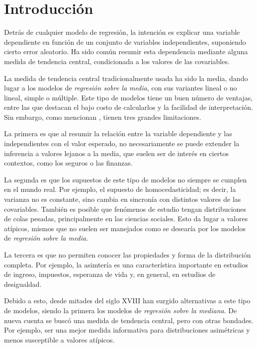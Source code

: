 \chapter{Introducci\'on}

Detr\'as de cualquier modelo de regresi\'on, la intenci\'on es explicar una variable dependiente en funci\'on de un conjunto de variables independientes, suponiendo cierto error aleatorio. Ha sido com\'un resumir esta dependencia mediante alguna medida de tendencia central, condicionada a los valores de las covariables.

La medida de tendencia central tradicionalmente usada ha sido la media, dando lugar a los modelos de \textit{regresi\'on sobre la media}, con sus variantes lineal o no lineal, simple o m\'ultiple. Este tipo de modelos tiene un buen n\'umero de ventajas, entre las que destacan el bajo costo de calcularlos y la facilidad de interpretaci\'on. Sin embargo, como mencionan \cite{Hao_FrecQuantReg}, tienen tres grandes limitaciones.

La primera es que al resumir la relaci\'on entre la variable dependiente y las independientes con el valor esperado, no necesariamente se puede extender la inferencia a valores lejanos a la media, que suelen ser de inter\'es en ciertos contextos, como los seguros o las finanzas.

La segunda es que los supuestos de este tipo de modelos no siempre se cumplen en el mundo real. Por ejemplo, el supuesto de homocedasticidad; es decir, la varianza no es constante, sino cambia en sincron\'ia con distintos valores de las covariables. Tambi\'en es posible que fen\'omenos de estudio tengan distribuciones de colas pesadas, principalmente en las ciencias sociales. Esto da lugar a valores at\'ipicos, mismos que no suelen ser manejados como se desear\'ia por los modelos de \textit{regresi\'on sobre la media}.

La tercera es que no permiten conocer las propiedades y forma de la distribuci\'on completa. Por ejemplo, la asimter\'ia es una caracter\'istica importante en estudios de ingreso, impuestos, esperanza de vida y, en general, en estudios de desigualdad.

Debido a esto, desde mitades del siglo XVIII han surgido alternativas a este tipo de modelos, siendo la primera los modelos de \textit{regresi\'on sobre la mediana}. De nueva cuenta se busc\'o una medida de tendencia central, pero con otras bondades. Por ejemplo, ser una mejor medida informativa para distribuciones asim\'etricas y menos susceptible a valores at\'ipicos. 

